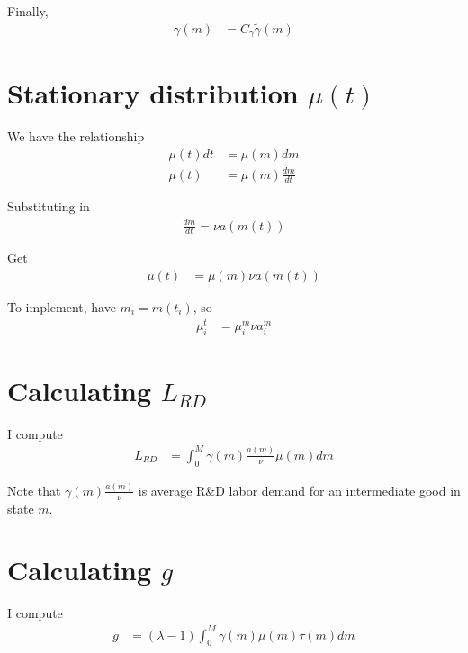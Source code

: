 \documentclass[12pt,english]{article}
\theoremstyle{remark}
\begin{document}
Finally, 
\begin{align*}
	\gamma(m) &= C_{\gamma} \tilde{\gamma}(m) 
\end{align*}

\section{Stationary distribution $\mu(t)$}

We have the relationship
\begin{align*}
\mu(t)dt &= \mu(m)dm \\
\mu(t) &= \mu(m) \frac{dm}{dt}
\end{align*}

Substituting in
\begin{align*}
\frac{dm}{dt} = \nu a(m(t))
\end{align*}

Get 
\begin{align*}
\mu(t) &= \mu(m) \nu a(m(t))
\end{align*}

To implement, have $m_i = m(t_i)$, so
\begin{align*}
\mu^t_i &= \mu^m_i \nu a^m_i 
\end{align*}

\section{Calculating $L_{RD}$}

I compute
\begin{align*}
	L_{RD} &= \int_0^M \gamma(m) \frac{a(m)}{\nu} \mu(m)  dm
\end{align*}

Note that $\gamma(m) \frac{a(m)}{\nu}$ is average R\&D labor demand for an intermediate good in state $m$.

\section{Calculating $g$}

I compute
\begin{align*}
	g &= (\lambda - 1)\int_0^M \gamma(m) \mu(m) \tau(m) dm
\end{align*}
\end{document}
